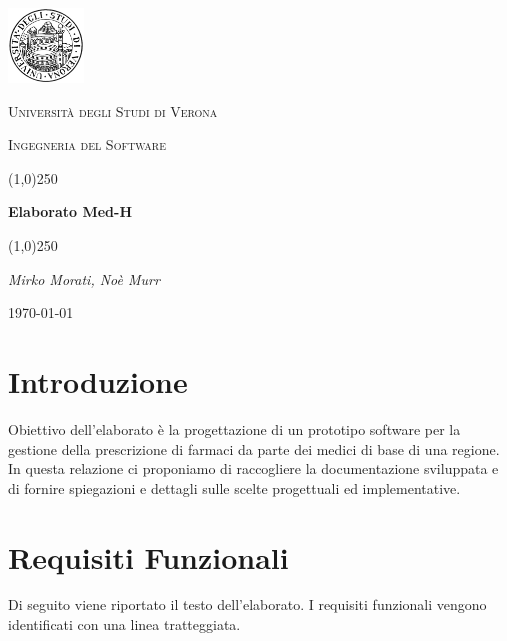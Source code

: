 \documentclass[a4paper, 11pt]{article}
\begin{document}
	\clearpage
\begin{titlepage}
	\centering
	\vspace*{\fill}
	\includegraphics[width=0.15\textwidth]{logo.png}\par\vspace{1cm}
	{\scshape\LARGE Università degli Studi di Verona \par}
	\vspace{1cm}
	{\scshape\Large Ingegneria del Software\par}
	\vspace{1.5cm}
	\line(1,0){250} \\
	{\huge\bfseries Elaborato Med-H\par}
	\line(1,0){250} \\
	\vspace{2cm}
	{\Large\itshape Mirko Morati, Noè Murr\par}
	\vspace{5cm}
	\vspace*{\fill}
	{\large \today\par}
\end{titlepage}
\thispagestyle{empty}
\newpage
\tableofcontents
\newpage

\section{Introduzione}
Obiettivo dell'elaborato è la progettazione di un prototipo software per la gestione della prescrizione di farmaci da parte dei medici di base di una regione.
In questa relazione ci proponiamo di raccogliere la documentazione sviluppata e di fornire spiegazioni e dettagli sulle scelte progettuali ed implementative. 

\section{Requisiti Funzionali}
Di seguito viene riportato il testo dell'elaborato. I requisiti funzionali vengono identificati con una linea tratteggiata.
\end{document}
